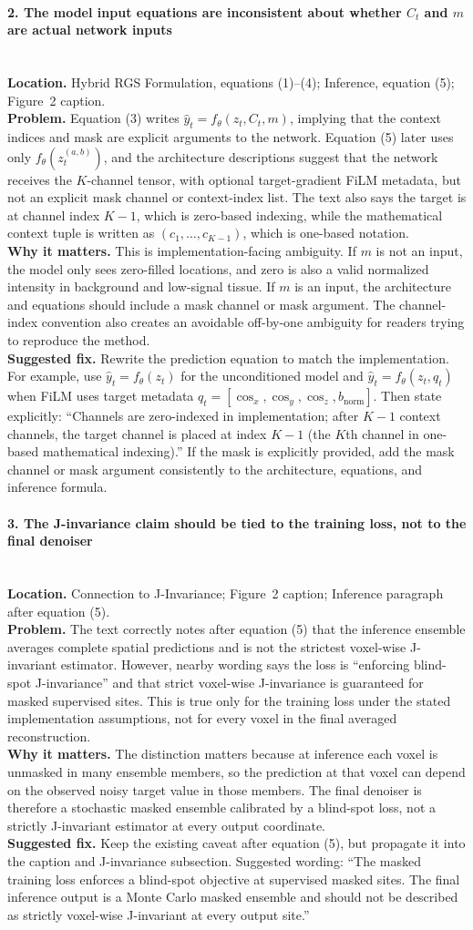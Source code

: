 \documentclass[11pt]{article}
\newcommand{\findingtitle}[1]{\paragraph{#1}\mbox{}\\}
\newcommand{\loc}[1]{\textbf{Location.} #1\\}
\newcommand{\problem}[1]{\textbf{Problem.} #1\\}
\newcommand{\why}[1]{\textbf{Why it matters.} #1\\}
\newcommand{\fix}[1]{\textbf{Suggested fix.} #1\par}
\begin{document}
\findingtitle{2. The model input equations are inconsistent about whether $C_t$ and $m$ are actual network inputs}
\loc{Hybrid RGS Formulation, equations (1)--(4); Inference, equation (5); Figure~2 caption.}
\problem{Equation (3) writes $\hat{y}_t=f_\theta(z_t,C_t,m)$, implying that the context indices and mask are explicit arguments to the network. Equation (5) later uses only $f_\theta(z_t^{(a,b)})$, and the architecture descriptions suggest that the network receives the $K$-channel tensor, with optional target-gradient FiLM metadata, but not an explicit mask channel or context-index list. The text also says the target is at channel index $K-1$, which is zero-based indexing, while the mathematical context tuple is written as $(c_1,\ldots,c_{K-1})$, which is one-based notation.}
\why{This is implementation-facing ambiguity. If $m$ is not an input, the model only sees zero-filled locations, and zero is also a valid normalized intensity in background and low-signal tissue. If $m$ is an input, the architecture and equations should include a mask channel or mask argument. The channel-index convention also creates an avoidable off-by-one ambiguity for readers trying to reproduce the method.}
\fix{Rewrite the prediction equation to match the implementation. For example, use $\hat{y}_t=f_\theta(z_t)$ for the unconditioned model and $\hat{y}_t=f_\theta(z_t,q_t)$ when FiLM uses target metadata $q_t=[\cos_x,\cos_y,\cos_z,b_{\mathrm{norm}}]$. Then state explicitly: ``Channels are zero-indexed in implementation; after $K-1$ context channels, the target channel is placed at index $K-1$ (the $K$th channel in one-based mathematical indexing).'' If the mask is explicitly provided, add the mask channel or mask argument consistently to the architecture, equations, and inference formula.}

\findingtitle{3. The J-invariance claim should be tied to the training loss, not to the final denoiser}
\loc{Connection to J-Invariance; Figure~2 caption; Inference paragraph after equation (5).}
\problem{The text correctly notes after equation (5) that the inference ensemble averages complete spatial predictions and is not the strictest voxel-wise J-invariant estimator. However, nearby wording says the loss is ``enforcing blind-spot J-invariance'' and that strict voxel-wise J-invariance is guaranteed for masked supervised sites. This is true only for the training loss under the stated implementation assumptions, not for every voxel in the final averaged reconstruction.}
\why{The distinction matters because at inference each voxel is unmasked in many ensemble members, so the prediction at that voxel can depend on the observed noisy target value in those members. The final denoiser is therefore a stochastic masked ensemble calibrated by a blind-spot loss, not a strictly J-invariant estimator at every output coordinate.}
\fix{Keep the existing caveat after equation (5), but propagate it into the caption and J-invariance subsection. Suggested wording: ``The masked training loss enforces a blind-spot objective at supervised masked sites. The final inference output is a Monte Carlo masked ensemble and should not be described as strictly voxel-wise J-invariant at every output site.''}
\end{document}
